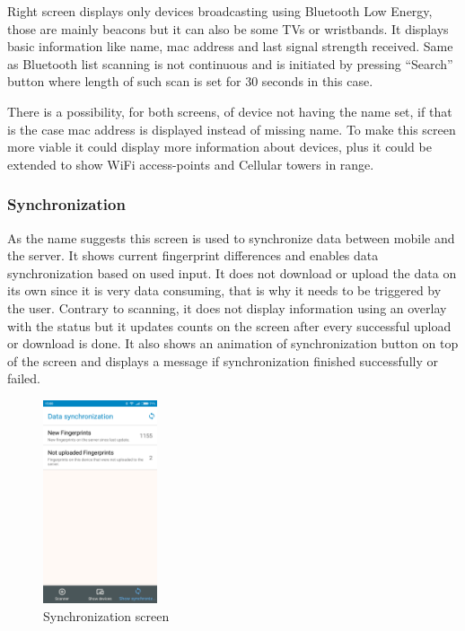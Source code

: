 Right screen displays only devices broadcasting using Bluetooth Low Energy, those are mainly beacons but it can also be some TVs or wristbands. It displays basic information like name, mac address and last signal strength received. Same as Bluetooth list scanning is not continuous and is initiated by pressing \enquote{Search} button where length of such scan is set for 30 seconds in this case.

There is a possibility, for both screens, of device not having the name set, if that is the case mac address is displayed instead of missing name. To make this screen more viable it could display more information about devices, plus it could be extended to show WiFi access-points and Cellular towers in range.

\subsubsection{Synchronization}\label{subsec:Synchronization}
As the name suggests this screen is used to synchronize data between mobile and the server. It shows current fingerprint differences and enables data synchronization based on used input. It does not download or upload the data on its own since it is very data consuming, that is why it needs to be triggered by the user. Contrary to scanning, it does not display information using an overlay with the status but it updates counts on the screen after every successful upload or download is done. It also shows an animation of synchronization button on top of the screen and displays a message if synchronization finished successfully or failed.

\begin{figure}[H]
	\begin{centering}
		\includegraphics[width=0.3\textwidth]{img/synchronization}
		\par\end{centering}
	\caption{Synchronization screen}
	\label{fig08c05}
\end{figure}

